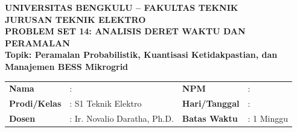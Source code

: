 \documentclass[11pt,a4paper]{article}
\begin{document}
\begin{center}
    {\large \textbf{\color{primaryblue}UNIVERSITAS BENGKULU -- FAKULTAS TEKNIK}}\\[0.1cm]
    {\large \textbf{\color{secondaryblue}JURUSAN TEKNIK ELEKTRO}}\\[0.2cm]
    {\LARGE \textbf{\color{primaryblue}PROBLEM SET 14: ANALISIS DERET WAKTU DAN PERAMALAN}}\\[0.1cm]
    {\normalsize \textbf{Topik: Peramalan Probabilistik, Kuantisasi Ketidakpastian, dan Manajemen BESS Mikrogrid}}
\end{center}

\vspace{0.1cm}

\begin{tcolorbox}[colback=boxbg,colframe=primaryblue,arc=2mm,title=\textbf{Informasi Tugas \& Identitas Mahasiswa}]
\small
\begin{tabular}{p{2.2cm}p{5.5cm}p{2.2cm}p{5.0cm}}
\textbf{Nama} & : \dotfill & \textbf{NPM} & : \dotfill \\
\textbf{Prodi/Kelas} & : S1 Teknik Elektro & \textbf{Hari/Tanggal} & : \dotfill \\
\textbf{Dosen} & : Ir. Novalio Daratha, Ph.D. & \textbf{Batas Waktu} & : 1 Minggu \\
\end{tabular}
\end{tcolorbox}

\vspace{0.2cm}
\end{document}
